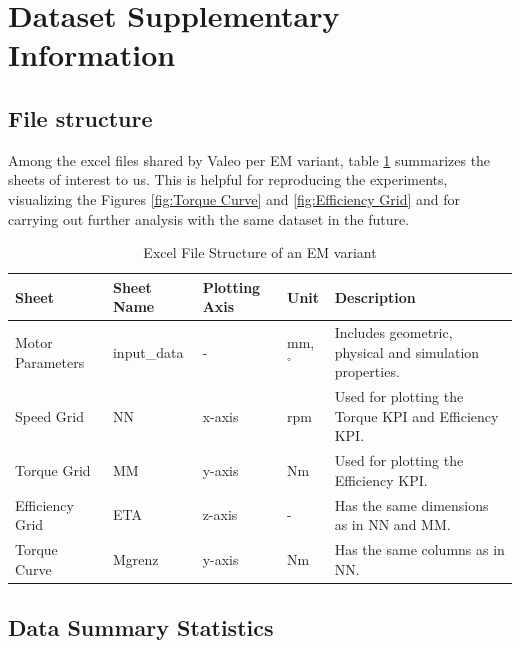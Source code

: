 \documentclass{report} %
\begin{document}
\section{Dataset Supplementary Information}
\label{sec:Dataset Supplementary Information}
\subsection{File structure}
\label{subsec:File structure}
Among the excel files shared by Valeo per \ac{EM} variant, table \ref{tab:Excel File Structure} summarizes the sheets of interest to us.
This is helpful for reproducing the experiments, visualizing the Figures \ref{fig:Torque Curve} and \ref{fig:Efficiency Grid} and for carrying out further analysis 
with the same dataset in the future.

\begin{table}[H]
    \centering
    \begin{tabular}{|p{1.7cm}|p{1.5cm}|p{1.3cm}|p{.7cm}|p{8.3cm}|}
    \hline
    {\bf Sheet} & {\bf Sheet Name} & {\bf Plotting Axis} & {\bf Unit} &  {\bf Description}\\
    \hline
    Motor Parameters & input\_data & - & mm, $^\circ$ & Includes geometric, physical and simulation properties.\\
    Speed Grid & NN & x-axis & rpm & Used for plotting the Torque \ac{KPI} and Efficiency \ac{KPI}.\\
    Torque Grid & MM & y-axis & Nm & Used for plotting the Efficiency \ac{KPI}.\\
    Efficiency Grid & ETA & z-axis & - & Has the same dimensions as in NN and MM. \\
    Torque Curve & Mgrenz & y-axis & Nm & Has the same columns as in NN. \\
    \hline
    \end{tabular}
    \caption{Excel File Structure of an \ac{EM} variant}
    \label{tab:Excel File Structure}
\end{table}

\subsection{Data Summary Statistics}
\label{subsec:Data Summary Statistics}
\end{document}
